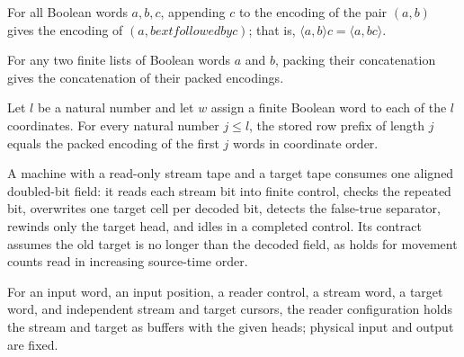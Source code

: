 \begin{lemma}
\label{Complexity.clPair_append}
\leanok
{}
For all Boolean words $a,b,c$, appending $c$ to the encoding of the pair $(a,b)$ gives
the encoding of $(a,b	ext{ followed by }c)$; that is, $\langle a,b\rangle c=\langle
a,bc\rangle$.
\end{lemma}

\begin{lemma}
\label{Complexity.clFields_append}
\leanok
{}
For any two finite lists of Boolean words $a$ and $b$, packing their concatenation gives
the concatenation of their packed encodings.
\end{lemma}

\begin{lemma}
\label{Complexity.clRowPrefix_fields}
\leanok
{}
Let $l$ be a natural number and let $w$ assign a finite Boolean word to each of the $l$
coordinates. For every natural number $j\le l$, the stored row prefix of length $j$
equals the packed encoding of the first $j$ words in coordinate order.
\end{lemma}

\begin{definition}
\label{Complexity.clReadTM}
\leanok
{}
A machine with a read-only stream tape and a target tape consumes one aligned doubled-bit field: it reads each stream bit into finite control, checks the repeated bit, overwrites one target cell per decoded bit, detects the false-true separator, rewinds only the target head, and idles in a completed control. Its contract assumes the old target is no longer than the decoded field, as holds for movement counts read in increasing source-time order.
\end{definition}

\begin{definition}
\label{Complexity.clReadCfg}
\leanok
{}
For an input word, an input position, a reader control, a stream word, a target word, and independent stream and target cursors, the reader configuration holds the stream and target as buffers with the given heads; physical input and output are fixed.
\end{definition}

